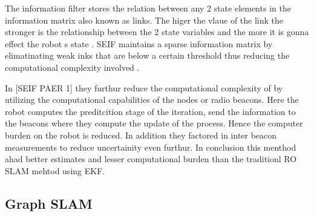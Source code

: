 \documentclass[conference]{IEEEtran}
\begin{document}
	The information filter stores the relation between any 2 state elements in the information matrix also known as links. The higer the vlaue of the link the stronger is the relationship between the 2 state variables and the more it is gonna effect the robot s state . SEIF maintains a sparse information matrix by elimatinating weak inks that are below a certain threshold thus reducing the computational complexity involved .
	
	In [SEIF PAER 1] they furthur reduce the computational complexity of by utilizing the computational capabilities of the nodes or radio  beacons. Here the robot computes the preditcition stage of the iteration, send the information to the beacons where they compute the update of the process. Hence the computer burden on the robot is reduced. In addition they factored in inter beacon measurements to reduce uncertainity even furthur.
	In conclusion this menthod ahad better estimates and lesser computational burden than the traditionl RO SLAM mehtod using EKF. 
	
	\subsection{Graph SLAM}
	
\end{document}
